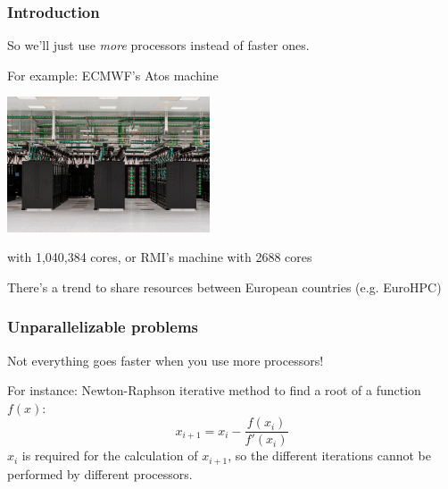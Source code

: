 \documentclass[aspectratio=43,9pt]{beamer}
\begin{document}
%
%
\begin{frame}
	\frametitle{Introduction}
	\begin{myitemize}{2ex}
		\item So we'll just use \emph{more} processors instead of faster ones.
		\item For example: ECMWF's Atos machine
			\begin{center}\vspace*{2ex}
				\includegraphics[width=6cm]{ecmwf_atos}
			\end{center}\vspace*{2ex}
			with 1,040,384 cores, or RMI's machine with 2688 cores
		\item There's a trend to share resources between European countries (e.g. EuroHPC)
	\end{myitemize}
\end{frame}
%
%
\begin{frame}
	\frametitle{Unparallelizable problems}
	\begin{myitemize}{2ex}
		\item Not everything goes faster when you use more processors!
		\item For instance: Newton-Raphson iterative method to find a root of a function $f(x)$:
			\begin{equation*}
				x_{i+1}=x_i-\frac{f(x_i)}{f'(x_i)}
			\end{equation*}
			$x_i$ is required for the calculation of $x_{i+1}$, so the different iterations cannot be performed by different processors.
	\end{myitemize}
\end{frame}
%
%
\end{document}
